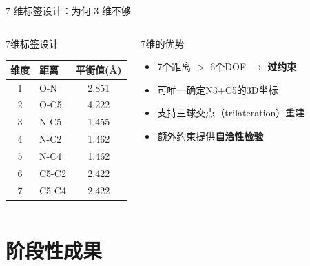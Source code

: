 \documentclass[aspectratio=169,9pt]{beamer}
\begin{document}
\begin{frame}{7 维标签设计：为何 3 维不够}
\begin{columns}[T]
\begin{block}{7维标签设计}
      \renewcommand{\arraystretch}{1.1}
      \begin{tabular}{@{}clc@{}}
        \toprule
        维度 & 距离 & 平衡值(\AA) \\
        \midrule
        1 & O-N & 2.851 \\
        2 & O-C5 & 4.222 \\
        3 & N-C5 & 1.455 \\
        \midrule
        4 & \textcolor{sciblue}{N-C2} & \textcolor{sciblue}{1.462} \\
        5 & \textcolor{sciblue}{N-C4} & \textcolor{sciblue}{1.462} \\
        6 & \textcolor{scigreen}{C5-C2} & \textcolor{scigreen}{2.422} \\
        7 & \textcolor{scigreen}{C5-C4} & \textcolor{scigreen}{2.422} \\
        \bottomrule
      \end{tabular}
    \end{block}

    \begin{exampleblock}{7维的优势}
      \scriptsize
      \begin{itemize}
        \item 7个距离 $>$ 6个DOF $\to$ \textbf{过约束}
        \item 可唯一确定N3+C5的3D坐标
        \item 支持三球交点（trilateration）重建
        \item 额外约束提供\textbf{自洽性检验}
      \end{itemize}
    \end{exampleblock}
  \end{columns}
\end{frame}

\section{阶段性成果}
\end{document}
